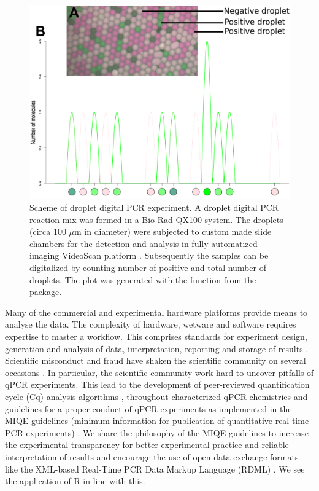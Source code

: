 \begin{figure}[htbp]
  \centering
  \includegraphics[clip=true, width=14cm]{figures/dpcR_sim.pdf}
  \caption{Scheme of droplet digital PCR experiment.  A droplet 
digital PCR reaction mix was formed in a Bio-Rad QX100 system. The droplets 
(circa 100 $\mu$m in diameter) were subjected to custom made slide chambers for 
the detection and analysis in fully automatized imaging VideoScan platform
\citep{rodiger_highly_2013}.  Subsequently the samples can be 
digitalized by counting number of positive and total number of droplets. The 
plot was generated with the  function from the  
package.}
\label{figure:dpcR_sim}
\end{figure}

Many of the commercial and experimental hardware platforms provide means to 
analyse the data. The complexity of hardware, wetware and software requires 
expertise to master a workflow. This comprises standards for experiment design, 
generation and analysis of data, interpretation, reporting and storage of 
results \citep{huggett_BDQ_2014}. Scientific misconduct and fraud have shaken 
the scientific community on several occasions \citep{fang_2012}. In particular, 
the scientific community work hard to uncover pitfalls of qPCR experiments. This 
lead to the development of peer-reviewed quantification cycle (Cq) analysis 
algorithms \citep{ruijter_2013}, throughout characterized qPCR chemistries 
\citep{ruijter_2014} and guidelines for a proper conduct of qPCR experiments as 
implemented in the MIQE guidelines (minimum information for publication of 
quantitative real-time PCR experiments) \citep{bustin_miqe_2009, huggett_2013}. 
We share the philosophy of the MIQE guidelines to increase the experimental 
transparency for better experimental practice and reliable interpretation of 
results and encourage the use of open data exchange formats like the XML-based 
Real-Time PCR Data Markup Language (RDML) \citep{lefever_2009}. We see the 
application of R in line with this. 

